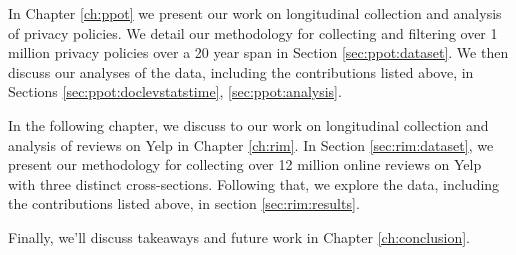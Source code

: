 In Chapter \ref{ch:ppot} we present our work on longitudinal collection and analysis of privacy policies. We detail our methodology for collecting and filtering over 1 million privacy policies over a 20 year span in Section \ref{sec:ppot:dataset}. We then discuss our analyses of the data, including the contributions listed above, in Sections \ref{sec:ppot:doclevstatstime}, \ref{sec:ppot:analysis}.%

In the following chapter, we discuss to our work on longitudinal collection and analysis of reviews on Yelp in Chapter \ref{ch:rim}. In Section \ref{sec:rim:dataset}, we present our methodology for collecting over 12 million online reviews on Yelp with three distinct cross-sections. Following that, we explore the data, including the contributions listed above, in section \ref{sec:rim:results}.%

Finally, we'll discuss takeaways and future work in Chapter \ref{ch:conclusion}. 